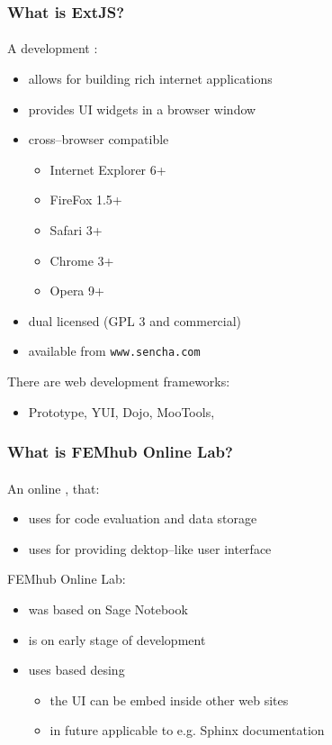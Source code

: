 \documentclass{beamer}
\begin{document}
\begin{frame}
    \frametitle{What is ExtJS?}
    \framesubtitle{}

    A  development :
    \begin{itemize}
        \pause
        \item allows for building rich internet applications
        \pause
        \item provides UI widgets in a browser window
        \pause
        \item cross--browser compatible
            \begin{itemize}
                \item Internet Explorer 6+
                \item FireFox 1.5+
                \item Safari 3+
                \item Chrome 3+
                \item Opera 9+
            \end{itemize}
        \pause
        \item dual licensed (GPL 3 and commercial)
        \pause
        \item available from \texttt{www.sencha.com}
    \end{itemize}
    \pause
    There are  web development frameworks:
    \begin{itemize}
        \pause
        \item Prototype, YUI, Dojo, MooTools, \structure{\ldots}
    \end{itemize}
\end{frame}

\begin{frame}
    \frametitle{What is FEMhub Online Lab?}
    \framesubtitle{}

    An  online , that:
    \begin{itemize}
        \pause
        \item uses  for code evaluation and data storage
        \pause
        \item uses  for providing dektop--like user interface
    \end{itemize}
    \pause
    FEMhub Online Lab:
    \begin{itemize}
        \pause
        \item was  based on Sage Notebook
        \pause
        \item is on early stage of development
        \pause
        \item uses  based desing
            \begin{itemize}
                \pause
                \item the UI can be embed inside other web sites
                \pause
                \item in future applicable to e.g. Sphinx documentation
            \end{itemize}
    \end{itemize}
\end{frame}
\end{document}
